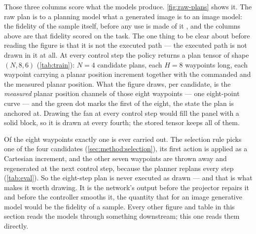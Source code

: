 Those three columns score what the models produce. \autoref{fig:raw-plans} shows it. The raw plan is to a
planning model what a generated image is to an image model: the fidelity of the sample itself, before any
use is made of it \parencite{ho2020denoising,lipman2023flow,geng2025meanflow}, and the columns above are
that fidelity scored on the task. The one thing to be clear about before reading the figure is that it is
not the executed path --- the executed path is not drawn in it
at all. At every control step the policy returns a plan tensor of shape $(N,8,6)$
(\autoref{tab:train}): $N=4$ candidate plans, each $H=8$ waypoints long, each waypoint carrying a planar
position increment together with the commanded and the measured planar position. What the figure draws,
per candidate, is the \emph{measured} planar position channels of those eight waypoints --- one
eight-point curve --- and the green dot marks the first of the eight, the state the plan is anchored at.
Drawing the fan at every control step would fill the panel with a solid block, so it is drawn at every
fourth; the stored tensor keeps all of them.

Of the eight waypoints exactly one is ever carried out. The selection rule picks one of the four
candidates (\autoref{sec:method:selection}), its first action is applied as a Cartesian increment, and the
other seven waypoints are thrown away and regenerated at the next control step, because the planner
replans every step (\autoref{tab:eval}). So the eight-step plan is never executed as drawn --- and that is
what makes it worth drawing. It is the network's output before the projector repairs it and before the
controller smooths it, the quantity that for an image generative model would be the fidelity of a sample.
Every other figure and table in this section reads the models through something downstream; this one reads
them directly.

